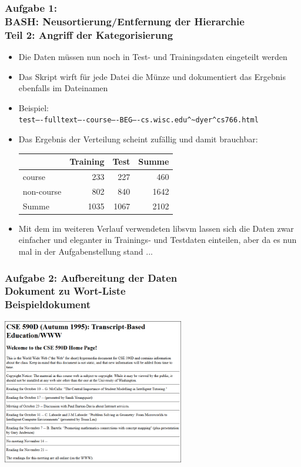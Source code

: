 \documentclass[accentcolor=tud7b,noresetcounter]{tudbeamer}
\begin{document}
	\begin{frame}
		\frametitle{Aufgabe 1: \\ BASH: Neusortierung/Entfernung der Hierarchie \\ Teil 2: Angriff der Kategorisierung}
		\begin{itemize}
			\item Die Daten müssen nun noch in Test- und Trainingsdaten eingeteilt werden
			\item Das Skript wirft für jede Datei die Münze und dokumentiert das Ergebnis ebenfalls im Dateinamen
			\item Beispiel: \\
			\texttt{test----fulltext----course----BEG----cs.wisc.edu\^{}\~{}dyer\^{}cs766.html}
			\item Das Ergebnis der Verteilung scheint zufällig und damit brauchbar: \\
			\begin{tabular}{|l|r|r||r|}
				\hline
& Training	& Test	& 	Summe \\
\hline
course	& 	233	& 	227	& 	460	\\
non-course	& 	802	& 	840	& 	1642	\\
\hline
\hline
Summe	& 	1035	& 	1067	& 2102\\
				\hline
			\end{tabular}
			\item Mit dem im weiteren Verlauf verwendeten libsvm lassen sich die Daten zwar einfacher und eleganter in Trainings- und Testdaten einteilen, aber da es nun mal in der Aufgabenstellung stand ...


		\end{itemize}

	\end{frame}
	
	
	\begin{frame}
		\frametitle{Aufgabe 2: Aufbereitung der Daten\\Dokument zu Wort-Liste\\Beispieldokument}
		\begin{center}
			\includegraphics[height=180pt]{img/sample2}
		\end{center}
	\end{frame}
	
\end{document}
